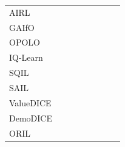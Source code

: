 \begin{table}[t]
{\begin{tabular}{lccccccc}
			AIRL~\citep{fu2017learning}  
			& {\scriptsize \CheckmarkBold} & {\scriptsize \textcolor{minetable1colorx}{\XSolidBrush}} & {\scriptsize \CheckmarkBold} & {\scriptsize \textcolor{minetable1colorx}{\XSolidBrush}} & {\scriptsize \textcolor{minetable1colorx}{\XSolidBrush}}   \\
			GAIfO~\citep{torabi2018generative} 
			& {\scriptsize \CheckmarkBold} & {\scriptsize \CheckmarkBold} & {\scriptsize \CheckmarkBold} & {\scriptsize \textcolor{minetable1colorx}{\XSolidBrush}} & {\scriptsize \textcolor{minetable1colorx}{\XSolidBrush}}   \\
			OPOLO~\citep{zhu2020off} 
			& {\scriptsize \CheckmarkBold} & {\scriptsize \CheckmarkBold} & {\scriptsize \CheckmarkBold} & {\scriptsize \textcolor{minetable1colorx}{\XSolidBrush}} & {\scriptsize \textcolor{minetable1colorx}{\XSolidBrush}}   \\
			IQ-Learn~\citep{garg2021iq}
			& {\scriptsize \CheckmarkBold} & {\scriptsize \CheckmarkBold} & {\scriptsize \CheckmarkBold} & {\scriptsize \CheckmarkBold} & {\scriptsize \textcolor{minetable1colorx}{\XSolidBrush}}  \\
			SQIL~\citep{reddy2019sqil}
			& {\scriptsize \CheckmarkBold} & {\scriptsize \textcolor{minetable1colorx}{\XSolidBrush}} & {\scriptsize \CheckmarkBold} & {\scriptsize \textcolor{minetable1colorx}{\XSolidBrush}} & {\scriptsize \textcolor{minetable1colorx}{\XSolidBrush}}  \\
			SAIL~\citep{liu2019state}
			& {\scriptsize \CheckmarkBold} & {\scriptsize \CheckmarkBold} & {\scriptsize \CheckmarkBold} & {\scriptsize \textcolor{minetable1colorx}{\XSolidBrush}} & {\scriptsize \CheckmarkBold}  \\
			ValueDICE~\citep{kostrikov2019imitation}
			& {\scriptsize \CheckmarkBold} & {\scriptsize \textcolor{minetable1colorx}{\XSolidBrush}} & {\scriptsize \CheckmarkBold} & {\scriptsize \textcolor{minetable1colorx}{\XSolidBrush}} & {\scriptsize \textcolor{minetable1colorx}{\XSolidBrush}}  \\
			DemoDICE~\citep{kim2022demodice}
			& {\scriptsize \CheckmarkBold} & {\scriptsize \textcolor{minetable1colorx}{\XSolidBrush}} & {\scriptsize \textcolor{minetable1colorx}{\XSolidBrush}} & {\scriptsize \CheckmarkBold} & {\scriptsize \textcolor{minetable1colorx}{\XSolidBrush}} \\
			ORIL~\citep{zolna2020offline}
			& {\scriptsize \CheckmarkBold} & {\scriptsize \CheckmarkBold} & {\scriptsize \textcolor{minetable1colorx}{\XSolidBrush}} & {\scriptsize \CheckmarkBold} & {\scriptsize \textcolor{minetable1colorx}{\XSolidBrush}}  \\

\end{tabular}}
\end{table}
